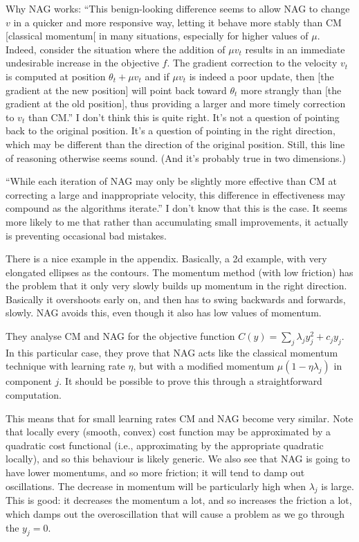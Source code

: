 \documentclass[12pt]{report}
\begin{document}
Why NAG works: ``This benign-looking difference seems to allow NAG to
change $v$ in a quicker and more responsive way, letting it behave
more stably than CM [classical momentum[ in many situations,
especially for higher values of $\mu$.  Indeed, consider the situation
where the addition of $\mu v_t$ results in an immediate undesirable
increase in the objective $f$.  The gradient correction to the
velocity $v_t$ is computed at position $\theta_t + \mu v_t$ and if
$\mu v_t$ is indeed a poor update, then [the gradient at the new
position] will point back toward $\theta_t$ more strangly than [the
gradient at the old position], thus providing a larger and more timely
correction to $v_t$ than CM.''  I don't think this is quite right.
It's not a question of pointing back to the original position.  It's a
question of pointing in the right direction, which may be different
than the direction of the original position. Still, this line of
reasoning otherwise seems sound.  (And it's probably true in two
dimensions.)

``While each iteration of NAG may only be slightly more effective than
CM at correcting a large and inappropriate velocity, this difference
in effectiveness may compound as the algorithms iterate.''  I don't
know that this is the case.  It seems more likely to me that rather
than accumulating small improvements, it actually is preventing
occasional bad mistakes.

There is a nice example in the appendix.  Basically, a 2d example,
with very elongated ellipses as the contours.  The momentum method
(with low friction) has the problem that it only very slowly builds up
momentum in the right direction.  Basically it overshoots early on,
and then has to swing backwards and forwards, slowly.  NAG avoids
this, even though it also has low values of momentum.

They analyse CM and NAG for the objective function $C(y) = \sum_j
\lambda_j y_j^2+ c_j y_j$.  In this particular case, they prove that
NAG acts like the classical momentum technique with learning rate
$\eta$, but with a modified momentum $\mu(1-\eta \lambda_j)$ in
component $j$.  It should be possible to prove this through a
straightforward computation.

This means that for small learning rates CM and NAG become very
similar.  Note that locally every (smooth, convex) cost function may
be approximated by a quadratic cost functional (i.e., approximating by
the appropriate quadratic locally), and so this behaviour is likely
generic.  We also see that NAG is going to have lower momentums, and
so more friction; it will tend to damp out oscillations.  The decrease
in momentum will be particularly high when $\lambda_j$ is large.  This
is good: it decreases the momentum a lot, and so increases the
friction a lot, which damps out the overoscillation that will cause a
problem as we go through the $y_j = 0$.
\end{document}

